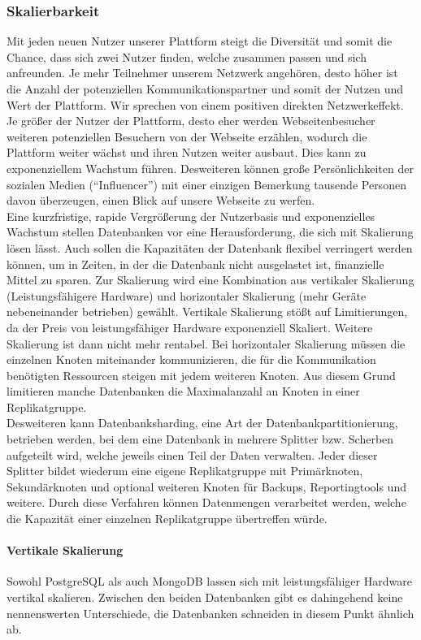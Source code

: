 \subsubsection{Skalierbarkeit}
Mit jeden neuen Nutzer unserer Plattform steigt die Diversität und somit die Chance, dass sich zwei Nutzer finden, welche zusammen passen und sich anfreunden. Je mehr Teilnehmer unserem Netzwerk angehören, desto höher ist die Anzahl der potenziellen Kommunikationspartner und somit der Nutzen und Wert der Plattform. Wir sprechen von einem positiven direkten Netzwerkeffekt. Je größer der Nutzer der Plattform, desto eher werden Webseitenbesucher weiteren potenziellen Besuchern von der Webseite erzählen, wodurch die Plattform weiter wächst und ihren Nutzen weiter ausbaut. Dies kann zu exponenziellem Wachstum führen. Desweiteren können große Persönlichkeiten der sozialen Medien (\enquote{Influencer}) mit einer einzigen Bemerkung tausende Personen davon überzeugen, einen Blick auf unsere Webseite zu werfen. \\
Eine kurzfristige, rapide Vergrößerung der Nutzerbasis und exponenzielles Wachstum stellen Datenbanken vor eine Herausforderung, die sich mit Skalierung lösen lässt. Auch sollen die Kapazitäten der Datenbank flexibel verringert werden können, um in Zeiten, in der die Datenbank nicht ausgelastet ist, finanzielle Mittel zu sparen. Zur Skalierung wird eine Kombination aus vertikaler Skalierung (Leistungsfähigere Hardware) und horizontaler Skalierung (mehr Geräte nebeneinander betrieben) gewählt. Vertikale Skalierung stößt auf Limitierungen, da der Preis von leistungsfähiger Hardware exponenziell Skaliert. Weitere Skalierung ist dann nicht mehr rentabel. Bei horizontaler Skalierung müssen die einzelnen Knoten miteinander kommunizieren, die für die Kommunikation benötigten Ressourcen steigen mit jedem weiteren Knoten. Aus diesem Grund limitieren manche Datenbanken die Maximalanzahl an Knoten in einer Replikatgruppe. \cite{MG3}\\
Desweiteren kann Datenbanksharding, eine Art der Datenbankpartitionierung, betrieben werden, bei dem eine Datenbank in mehrere Splitter bzw. Scherben aufgeteilt wird, welche jeweils einen Teil der Daten verwalten. Jeder dieser Splitter bildet wiederum eine eigene Replikatgruppe mit Primärknoten, Sekundärknoten und optional weiteren Knoten für Backups, Reportingtools und weitere. Durch diese Verfahren können Datenmengen verarbeitet werden, welche die Kapazität einer einzelnen Replikatgruppe übertreffen würde. \cite{MS1}

\paragraph{Vertikale Skalierung\\}
Sowohl PostgreSQL als auch MongoDB lassen sich mit leistungsfähiger Hardware vertikal skalieren. Zwischen den beiden Datenbanken gibt es dahingehend keine nennenswerten Unterschiede, die Datenbanken schneiden in diesem Punkt ähnlich ab.

